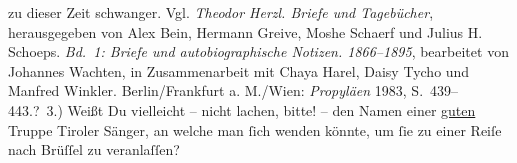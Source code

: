 \begin{ledgroupsized}[t]{13cm}
{{{                     zu dieser Zeit schwanger. Vgl. \emph{Theodor Herzl. Briefe und
                        Tagebücher}, herausgegeben von Alex Bein, Hermann Greive, Moshe Schaerf und
                        Julius H. Schoeps. \emph{Bd. 1: Briefe und autobiographische
                           Notizen. 1866–1895}, bearbeitet von Johannes Wachten, in
                        Zusammenarbeit mit Chaya Harel, Daisy Tycho und Manfred Winkler.
                        Berlin/Frankfurt a. M./Wien:
                           \emph{Propyläen}{ }1983, S. 439–443.}}}\label{K_L02669-19h}? 3.) Weißt Du
                  vielleicht – nicht lachen, bitte! – den Namen einer \uline{guten}{ } Truppe Tiroler Sänger, \introOben{}an\introOben{} welche man ſich wenden könnte, um ſie zu einer Reiſe
                  nach Brüſſel zu veranlaſſen?\pend
           
         
         \endnumbering{}\end{ledgroupsized}  \newcommand{\dateiname}{L02669}\newcommand{\titel}{Paul Goldmann an Arthur Schnitzler, 27. 10. 1891}\newcommand{\editorInnen}{Martin Anton Müller und Laura Untner}
      